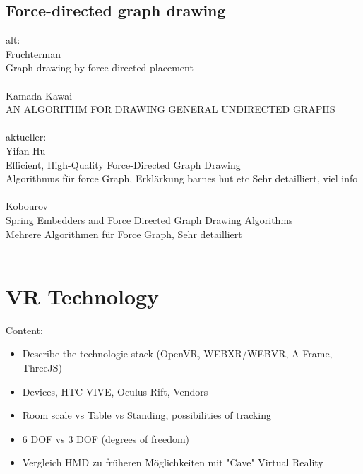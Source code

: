 \subsection{Force-directed graph drawing}
alt:\\
Fruchterman\\
Graph drawing by force-directed placement\\
\\
Kamada Kawai\\
AN ALGORITHM FOR DRAWING GENERAL UNDIRECTED GRAPHS\\
\\

aktueller:\\
Yifan Hu\\
Efficient, High-Quality Force-Directed Graph Drawing\\
Algorithmus für force Graph,  Erklärkung barnes hut etc Sehr detailliert, viel info\\
\\
Kobourov\\
Spring Embedders and Force Directed Graph Drawing Algorithms\\
Mehrere Algorithmen für Force Graph, Sehr detailliert\\
\\

\section{VR Technology}

Content:
\begin{itemize}
    \item Describe the technologie stack (OpenVR, WEBXR/WEBVR, A-Frame, ThreeJS)
    \item Devices, HTC-VIVE, Oculus-Rift, Vendors
    \item Room scale vs Table vs Standing, possibilities of tracking
    \item 6 DOF vs 3 DOF (degrees of freedom)
    \item Vergleich HMD zu früheren Möglichkeiten mit "Cave" Virtual Reality
\end{itemize}

